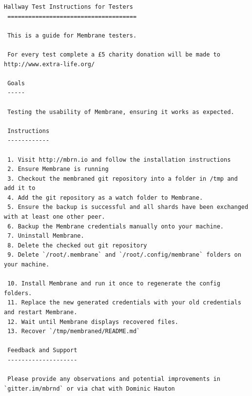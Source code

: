 \documentclass[11pt, a4paper, twocolumn, twoside]{report}
\begin{document}
\begin{lstlisting}[language=RsT, caption=Membrane Hallway Test Guide, label=lst:mbrntst]
 Hallway Test Instructions for Testers
 =====================================
 
 This is a guide for Membrane testers.
 
 For every test complete a £5 charity donation will be made to http://www.extra-life.org/
 
 Goals
 -----
 
 Testing the usability of Membrane, ensuring it works as expected.
 
 Instructions
 ------------
 
 1. Visit http://mbrn.io and follow the installation instructions
 2. Ensure Membrane is running
 3. Checkout the membraned git repository into a folder in /tmp and add it to
 4. Add the git repository as a watch folder to Membrane.
 5. Ensure the backup is successful and all shards have been exchanged with at least one other peer.
 6. Backup the Membrane credentials manually onto your machine.
 7. Uninstall Membrane.
 8. Delete the checked out git repository
 9. Delete `/root/.membrane` and `/root/.config/membrane` folders on your machine.
 
 10. Install Membrane and run it once to regenerate the config folders.
 11. Replace the new generated credentials with your old credentials and restart Membrane.
 12. Wait until Membrane displays recovered files.
 13. Recover `/tmp/membraned/README.md`
 
 Feedback and Support
 --------------------
 
 Please provide any observations and potential improvements in `gitter.im/mbrnd` or via chat with Dominic Hauton
\end{lstlisting}
\end{document}
